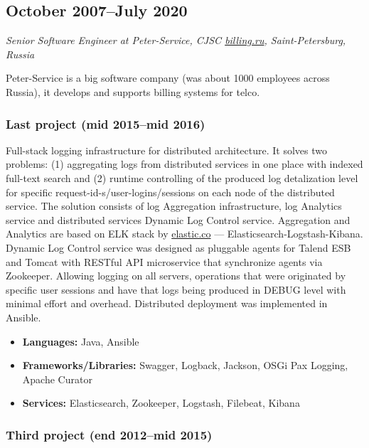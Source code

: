 \subsection*{October 2007--July 2020}

\textit{Senior Software Engineer at Peter-Service, CJSC
\href{https://billing.ru}{billing.ru}, Saint-Petersburg, Russia}

Peter-Service is a big software company (was about 1000 employees
across Russia), it develops and supports billing systems for telco.

\subsubsection*{Last project (mid 2015--mid 2016)}

Full-stack logging infrastructure for distributed architecture. It
solves two problems: (1) aggregating logs from distributed services in
one place with indexed full-text search and (2) runtime controlling of
the produced log detalization level for specific
request-id-s/user-logins/sessions on each node of the distributed
service. The solution consists of log Aggregation infrastructure, log
Analytics service and distributed services Dynamic Log Control
service. Aggregation and Analytics are based on ELK stack by
\href{https://elastic.co}{elastic.co} ---
Elasticsearch-Logstash-Kibana. Dynamic Log Control service was
designed as pluggable agents for Talend ESB and Tomcat with RESTful
API microservice that synchronize agents via Zookeeper. Allowing
logging on all servers, operations that were originated by specific
user sessions and have that logs being produced in DEBUG level with
minimal effort and overhead. Distributed deployment was implemented in
Ansible.

\begin{itemize}[noitemsep, nosep]
  \item \textbf{Languages:} Java, Ansible
  \item \textbf{Frameworks/Libraries:} Swagger, Logback, Jackson, OSGi
Pax Logging, Apache Curator
  \item \textbf{Services:} Elasticsearch, Zookeeper, Logstash,
Filebeat, Kibana
\end{itemize}

\subsubsection*{Third project (end 2012--mid 2015)}


